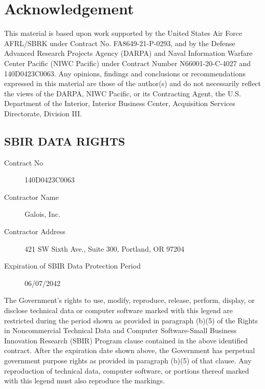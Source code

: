 \section{Acknowledgement}

This material is based upon work supported by the United States Air Force AFRL/SBRK under Contract No. FA8649-21-P-0293, and by the Defense Advanced Research Projects Agency (DARPA) and Naval Information Warfare Center Pacific (NIWC Pacific) under Contract Number N66001-20-C-4027 and 140D0423C0063. Any opinions, findings and conclusions or recommendations expressed in this material are those of the author(s) and do not necessarily reflect the views of the DARPA, NIWC Pacific, or its Contracting Agent, the U.S. Department of the Interior, Interior Business Center, Acquisition Services Directorate, Division III.

\subsection*{SBIR DATA RIGHTS}

\begin{description}
\item[Contract No] 140D0423C0063
\item[Contractor Name] Galois, Inc.
\item[Contractor Address] 421 SW Sixth Ave., Suite 300, Portland, OR 97204
\item[Expiration of SBIR Data Protection Period] 06/07/2042
\end{description}

The Government's rights to use, modify, reproduce, release, perform, display, or disclose technical data or computer software marked with this legend are restricted during the period shown as provided in paragraph (b)(5) of the Rights in Noncommercial Technical Data and Computer Software-Small Business Innovation Research (SBIR) Program clause contained in the above identified contract.
After the expiration date shown above, the Government has perpetual government purpose rights as provided in paragraph (b)(5) of that clause.
Any reproduction of technical data, computer software, or portions thereof marked with this legend must also reproduce the markings.

